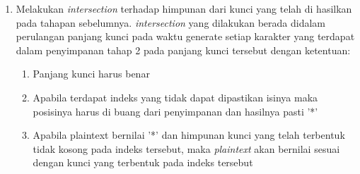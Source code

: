 \begin{enumerate}
	\item Melakukan \textit{intersection} terhadap himpunan dari kunci yang telah di hasilkan pada tahapan sebelumnya\cite{john_jones_spoj_2009}. \textit{intersection} yang dilakukan berada didalam perulangan panjang kunci pada waktu generate setiap karakter yang terdapat dalam penyimpanan tahap 2 pada panjang kunci tersebut dengan ketentuan:
	\begin{enumerate}
	\item Panjang kunci harus benar
	\item Apabila terdapat indeks yang tidak dapat dipastikan isinya maka posisinya harus di buang dari penyimpanan dan hasilnya pasti '*'
	\item Apabila plaintext bernilai '*' dan himpunan kunci yang telah terbentuk tidak kosong pada indeks tersebut, maka \textit{plaintext} akan bernilai sesuai dengan kunci yang terbentuk pada indeks tersebut
	\end{enumerate} 
\end{enumerate}	

	